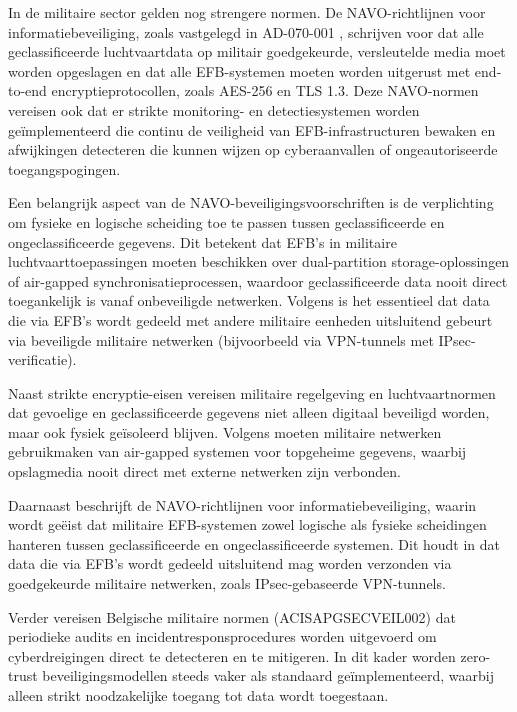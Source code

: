 In de militaire sector gelden nog strengere normen. De NAVO-richtlijnen voor informatiebeveiliging, zoals vastgelegd in AD-070-001 \autocite{AD070001}, schrijven voor dat alle geclassificeerde luchtvaartdata op militair goedgekeurde, versleutelde media moet worden opgeslagen en dat alle EFB-systemen moeten worden uitgerust met end-to-end encryptieprotocollen, zoals AES-256 en TLS 1.3. Deze NAVO-normen vereisen ook dat er strikte monitoring- en detectiesystemen worden geïmplementeerd die continu de veiligheid van EFB-infrastructuren bewaken en afwijkingen detecteren die kunnen wijzen op cyberaanvallen of ongeautoriseerde toegangspogingen.

Een belangrijk aspect van de NAVO-beveiligingsvoorschriften is de verplichting om fysieke en logische scheiding toe te passen tussen geclassificeerde en ongeclassificeerde gegevens. Dit betekent dat EFB’s in militaire luchtvaarttoepassingen moeten beschikken over dual-partition storage-oplossingen of air-gapped synchronisatieprocessen, waardoor geclassificeerde data nooit direct toegankelijk is vanaf onbeveiligde netwerken. Volgens \textcite{AD070001} is het essentieel dat data die via EFB’s wordt gedeeld met andere militaire eenheden uitsluitend gebeurt via beveiligde militaire netwerken (bijvoorbeeld via VPN-tunnels met IPsec-verificatie).

Naast strikte encryptie-eisen vereisen militaire regelgeving en luchtvaartnormen dat gevoelige en geclassificeerde gegevens niet alleen digitaal beveiligd worden, maar ook fysiek geïsoleerd blijven. Volgens \textcite{ACISAPGSECVEIL001} moeten militaire netwerken gebruikmaken van air-gapped systemen voor topgeheime gegevens, waarbij opslagmedia nooit direct met externe netwerken zijn verbonden.

Daarnaast beschrijft \textcite{AD070001} de NAVO-richtlijnen voor informatiebeveiliging, waarin wordt geëist dat militaire EFB-systemen zowel logische als fysieke scheidingen hanteren tussen geclassificeerde en ongeclassificeerde systemen. Dit houdt in dat data die via EFB’s wordt gedeeld uitsluitend mag worden verzonden via goedgekeurde militaire netwerken, zoals IPsec-gebaseerde VPN-tunnels.

Verder vereisen Belgische militaire normen (ACISAPGSECVEIL002) dat periodieke audits en incidentresponsprocedures worden uitgevoerd om cyberdreigingen direct te detecteren en te mitigeren. In dit kader worden zero-trust beveiligingsmodellen steeds vaker als standaard geïmplementeerd, waarbij alleen strikt noodzakelijke toegang tot data wordt toegestaan.

